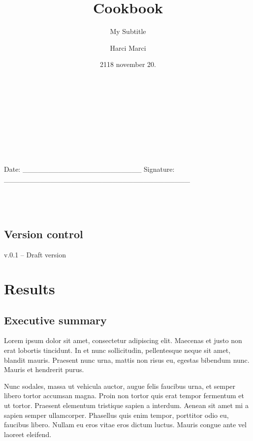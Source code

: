 \documentclass[
]{article}
\title{Cookbook}
\subtitle{My Subtitle}
\author{Harci Marci}
\date{2118 november 20.}
\begin{document}
\maketitle

{
\setcounter{tocdepth}{3}
\tableofcontents
}
\(~\)\\
\(~\)\\
\(~\)\\
\(~\)\\
\(~\)\\
\(~\)\\
\(~\)\\
Date: \_\_\_\_\_\_\_\_\_\_\_\_\_\_\_\_\_\_\_\_\_\_\_ Signature:
\_\_\_\_\_\_\_\_\_\_\_\_\_\_\_\_\_\_\_\_\_\_\_\_\_\_\_\_\_\_\_\_\_\_\_\_
\(~\)\\
\(~\)\\
\(~\)\\
\(~\)\\

\hypertarget{version-control}{%
\subsection*{Version control}\label{version-control}}

v.0.1 -- Draft version

\newpage

\listoffigures
\listoftables
\pagebreak

\hypertarget{results}{%
\section{Results}\label{results}}

\renewcommand\floatpagefraction{0.8}

\graphicspath{ {../figures} {../inst/cookbook_files/figure-latex/} {../figure-latex/} {../inst/01_chap1_files/figure-latex/}}

\hypertarget{executive-summary}{%
\subsection{Executive summary}\label{executive-summary}}

Lorem ipsum dolor sit amet, consectetur adipiscing elit. Maecenas et
justo non erat lobortis tincidunt. In et nunc sollicitudin, pellentesque
neque sit amet, blandit mauris. Praesent nunc urna, mattis non risus eu,
egestas bibendum nunc. Mauris et hendrerit purus.

Nunc sodales, massa ut vehicula auctor, augue felis faucibus urna, et
semper libero tortor accumsan magna. Proin non tortor quis erat tempor
fermentum et ut tortor. Praesent elementum tristique sapien a interdum.
Aenean sit amet mi a sapien semper ullamcorper. Phasellus quis enim
tempor, porttitor odio eu, faucibus libero. Nullam eu eros vitae eros
dictum luctus. Mauris congue ante vel laoreet eleifend.
\end{document}
